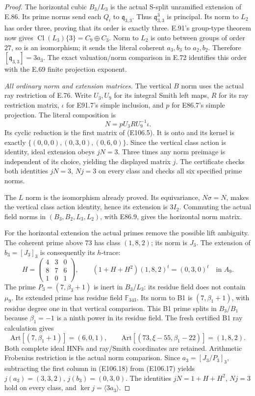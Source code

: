\begin{proof}
The horizontal cubic $B_3/L_3$ is the actual S-split
unramified extension of E.86. Its prime norms send each
$Q_i$ to $\mathfrak q_{3,3}$. Thus $\mathfrak q_{3,3}^3$
is principal. Its norm to $L_2$ has order three, proving
that its order is exactly three. E.91's group-type theorem
now gives $\operatorname{Cl}(L_3)\{3\}=C_9\oplus C_3$.
Norm to $L_2$ is onto between groups of order $27$, so is
an isomorphism; it sends the literal coherent $a_3,b_3$
to $a_2,b_2$. Therefore $[\mathfrak q_{3,3}]=3a_3$.
The exact valuation/norm comparison in E.72 identifies
this order with the E.69 finite projection exponent.

\emph{All ordinary norm and extension matrices.}
The vertical $B$ norm uses the actual ray restriction of
E.76. Write $U_3,U_9$ for its integral Smith left maps,
$R$ for its ray restriction matrix, $\iota$ for E91.7's
simple inclusion, and $p$ for E86.7's simple projection.
The literal composition is
\[
                         N=pU_3R U_9^{-1}\iota .
 \tag{E106.16}
\]
Its cyclic reduction is the first matrix of (E106.5).
It is onto and its kernel is exactly
$\{(0,0,0),(0,3,0),(0,6,0)\}$. Since the vertical class
action is identity, ideal extension obeys $jN=3$.
Three times any norm preimage is independent of its
choice, yielding the displayed matrix $j$. The certificate
checks both identities $jN=3$, $Nj=3$ on every class and
checks all six specified prime norms.

The $L$ norm is the isomorphism already proved. Its
equivariance, $N\sigma=N$, makes the vertical class action
identity, hence its extension is $3I_2$. Commuting the
actual field norms in $(B_3,B_2,L_3,L_2)$, with E86.9,
gives the horizontal norm matrix.

For the horizontal extension the actual primes remove
the possible lift ambiguity. The coherent prime above
$73$ has class $(1,8,2)$; its norm is $J_3$. The
extension of $b_3=[J_3]_3$ is consequently its $h$-trace:
\[
 H=\begin{pmatrix}4&3&0\\8&7&6\\1&0&1\end{pmatrix},
 \qquad (1+H+H^2)(1,8,2)^t=(0,3,0)^t\quad\text{in }A_9.
 \tag{E106.17}
\]
The prime $P_3=(7,\beta_3+1)$ is inert in $B_3/L_3$:
its residue field does not contain $\mu_9$. Its extended
prime has residue field $\mathbb F_{343}$. Its norm to
B1 is $(7,\beta_1+1)$, with residue degree one in that
vertical comparison. This B1 prime splits in $B_3/B_1$
because $\beta_1=-1$ is a ninth power in its residue field.
The fresh certified B1 ray calculation gives
\[
 \mathrm{Art}[(7,\beta_1+1)]=(6,0,1),\qquad
 \mathrm{Art}[(73,\xi-55,\beta_1-22)]=(1,8,2).
 \tag{E106.18}
\]
Both complete ideal HNFs and ray/Smith coordinates are
retained. Arithmetic Frobenius restriction is the actual
norm comparison. Since $a_3=[J_3/P_3]_3$, subtracting
the first column in (E106.18) from (E106.17) yields
$j(a_3)=(3,3,2)$, $j(b_3)=(0,3,0)$.
The identities $jN=1+H+H^2$, $Nj=3$ hold on every class,
and $\ker j=\langle3a_3\rangle$.


\end{proof}
